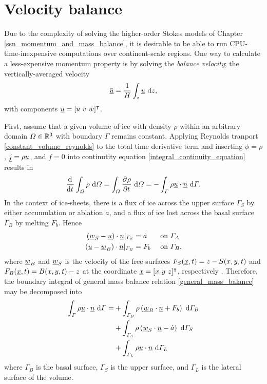 
\chapter{Velocity balance} \label{ssn_balance_velocity}

Due to the complexity of solving the higher-order Stokes models of Chapter \cref{ssn_momentum_and_mass_balance}, it is desirable to be able to run CPU-time-inexpensive computations over continent-scale regions.
One way to calculate a less-expensive momentum property is by solving the \emph{balance velocity}; the vertically-averaged velocity
\begin{align}
  \label{balance_velocity}
  \bar{\underline{u}} = \frac{1}{H} \int_z \underline{u} \ \mathrm{d}z,
\end{align}
with components $\bar{\rankone{u}} = [\bar{u}\ \bar{v}\ \bar{w}]\T$.  

First, assume that a given volume of ice with density $\rho$ within an arbitrary domain $\varOmega \in \mathbb{R}^3$ with boundary $\Gamma$ remains constant.
Applying Reynolds tranport \cref{constant_volume_reynolds} to the total time derivative term and inserting $\phi = \rho$, $\underline{j} = \rho \underline{u}$, and $f=0$ into continutity equation \cref{integral_continuity_equation} results in 
\begin{align}
  \label{general_mass_balance}
  \frac{\mathrm{d}{^{}} }{\mathrm{d} t{^{}} } \int_{\varOmega} \rho \ \mathrm{d}\varOmega = \int_{\varOmega} \frac{\partial{^{}} \rho}{\partial t{^{}} } \ \mathrm{d}\varOmega = - \int_{\varGamma} \rho \underline{u} \cdot \underline{n} \ \mathrm{d}\varGamma.
\end{align}
In the context of ice-sheets, there is a flux of ice across the upper surface $\Gamma_S$ by either accumulation or ablation $\dot{a}$, and a flux of ice lost across the basal surface $\Gamma_B$ by melting $F_b$.
Hence
\begin{align}
  \label{surface_mass_loss}
  \left( \underline{w}_S - \underline{u} \right) \cdot \underline{n} |_{\varGamma_S} &= \dot{a} &&\text{ on } \varGamma_A  \\
  \label{basal_mass_loss}
  \left( \underline{u} - \underline{w}_B \right) \cdot \underline{n} |_{\varGamma_B} &= F_b &&\text{ on } \varGamma_B ,
\end{align}
where $\underline{w}_B$ and $\underline{w}_S$ is the velocity of the free surfaces $F_S(\underline{x},t) = z - S(x,y,t)$ and $F_B(\underline{x},t) = B(x,y,t) - z$ at the coordinate $\underline{x} = [x\ y\ z]^\intercal$, respectively \citep{greve_1997}.  Therefore, the boundary integral of general mass balance relation \cref{general_mass_balance} may be decomposed into
\begin{align*}
  \int_{\varGamma} \rho \underline{u} \cdot \underline{n} \ \mathrm{d}\varGamma = &+ \int_{\varGamma_B} \rho \left( \underline{w}_B \cdot \underline{n} + F_b \right) \ \mathrm{d}\varGamma_B \\
  &+ \int_{\varGamma_S} \rho \left( \underline{w}_S \cdot \underline{n} - \dot{a} \right) \ \mathrm{d}\varGamma_S \\
  &+ \int_{\varGamma_L} \rho \underline{u} \cdot \underline{n} \ \mathrm{d}\varGamma_L 
\end{align*}
where $\Gamma_B$ is the basal surface, $\Gamma_S$ is the upper surface, and $\Gamma_L$ is the lateral surface of the volume.

